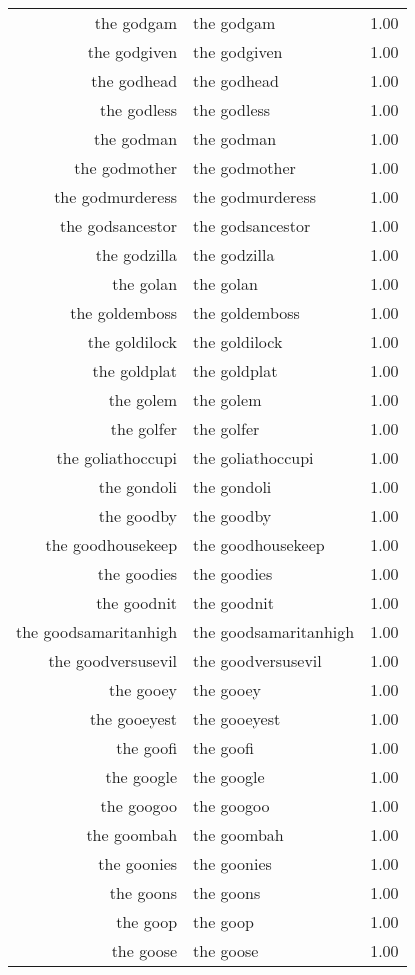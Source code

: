 \begin{table}[ht]
\begin{tabular}{rlr}
  the godgam & the godgam & 1.00 \\ 
  the godgiven & the godgiven & 1.00 \\ 
  the godhead & the godhead & 1.00 \\ 
  the godless & the godless & 1.00 \\ 
  the godman & the godman & 1.00 \\ 
  the godmother & the godmother & 1.00 \\ 
  the godmurderess & the godmurderess & 1.00 \\ 
  the godsancestor & the godsancestor & 1.00 \\ 
  the godzilla & the godzilla & 1.00 \\ 
  the golan & the golan & 1.00 \\ 
  the goldemboss & the goldemboss & 1.00 \\ 
  the goldilock & the goldilock & 1.00 \\ 
  the goldplat & the goldplat & 1.00 \\ 
  the golem & the golem & 1.00 \\ 
  the golfer & the golfer & 1.00 \\ 
  the goliathoccupi & the goliathoccupi & 1.00 \\ 
  the gondoli & the gondoli & 1.00 \\ 
  the goodby & the goodby & 1.00 \\ 
  the goodhousekeep & the goodhousekeep & 1.00 \\ 
  the goodies & the goodies & 1.00 \\ 
  the goodnit & the goodnit & 1.00 \\ 
  the goodsamaritanhigh & the goodsamaritanhigh & 1.00 \\ 
  the goodversusevil & the goodversusevil & 1.00 \\ 
  the gooey & the gooey & 1.00 \\ 
  the gooeyest & the gooeyest & 1.00 \\ 
  the goofi & the goofi & 1.00 \\ 
  the google & the google & 1.00 \\ 
  the googoo & the googoo & 1.00 \\ 
  the goombah & the goombah & 1.00 \\ 
  the goonies & the goonies & 1.00 \\ 
  the goons & the goons & 1.00 \\ 
  the goop & the goop & 1.00 \\ 
  the goose & the goose & 1.00 \\ 

\end{tabular}
\end{table}
